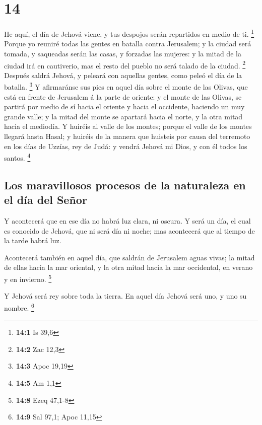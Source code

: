\hypertarget{section-13}{%
\section{14}\label{section-13}}

 He aquí, el día de Jehová viene, y tus despojos serán
repartidos en medio de ti. \footnote{\textbf{14:1} Is 39,6}
 Porque yo reuniré todas las gentes en batalla contra
Jerusalem; y la ciudad será tomada, y saqueadas serán las casas, y
forzadas las mujeres: y la mitad de la ciudad irá en cautiverio, mas el
resto del pueblo no será talado de la ciudad. \footnote{\textbf{14:2}
  Zac 12,3}  Después saldrá Jehová, y peleará con aquellas
gentes, como peleó el día de la batalla. \footnote{\textbf{14:3} Apoc
  19,19}  Y afirmaránse sus pies en aquel día sobre el
monte de las Olivas, que está en frente de Jerusalem á la parte de
oriente: y el monte de las Olivas, se partirá por medio de sí hacia el
oriente y hacia el occidente, haciendo un muy grande valle; y la mitad
del monte se apartará hacia el norte, y la otra mitad hacia el mediodía.
 Y huiréis al valle de los montes; porque el valle de los
montes llegará hasta Hasal; y huiréis de la manera que huisteis por
causa del terremoto en los días de Uzzías, rey de Judá: y vendrá Jehová
mi Dios, y con él todos los santos. \footnote{\textbf{14:5} Am 1,1}

\hypertarget{los-maravillosos-procesos-de-la-naturaleza-en-el-duxeda-del-seuxf1or}{%
\subsection{Los maravillosos procesos de la naturaleza en el día del
Señor}\label{los-maravillosos-procesos-de-la-naturaleza-en-el-duxeda-del-seuxf1or}}

 Y acontecerá que en ese día no habrá luz clara, ni
oscura.  Y será un día, el cual es conocido de Jehová, que
ni será día ni noche; mas acontecerá que al tiempo de la tarde habrá
luz.

 Acontecerá también en aquel día, que saldrán de Jerusalem
aguas vivas; la mitad de ellas hacia la mar oriental, y la otra mitad
hacia la mar occidental, en verano y en invierno. \footnote{\textbf{14:8}
  Ezeq 47,1-8}

 Y Jehová será rey sobre toda la tierra. En aquel día
Jehová será uno, y uno su nombre. \footnote{\textbf{14:9} Sal 97,1; Apoc
  11,15}

